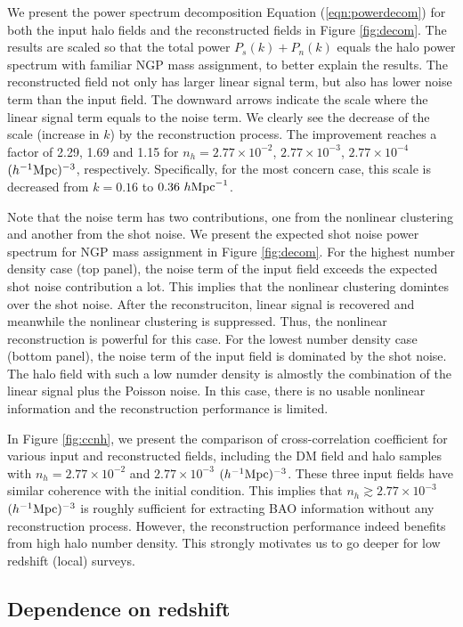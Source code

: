 \documentclass[iop]{emulateapj}
\newcommand{\mpch}{h^{-1} {\rm Mpc}}
\newcommand{\hmpc}{h {\rm Mpc}^{-1}}
\begin{document}
{We present the power spectrum decomposition Equation (\ref{eqn:powerdecom}) for both the input halo fields and the reconstructed fields in Figure \ref{fig:decom}.
The results are scaled so that the total power $P_s(k)+P_n(k)$ equals the halo power spectrum with familiar NGP mass assignment, to better explain the results.
The reconstructed field not only has larger linear signal term, but also has lower noise term than the input field.
The downward arrows indicate the scale where the linear signal term equals to the noise term.
We clearly see the decrease of the scale (increase in $k$) by the reconstruction process.
The improvement reaches a factor of 2.29, 1.69 and 1.15 for $n_h=2.77\times 10^{-2}$, $2.77\times 10^{-3}$, $2.77\times 10^{-4}$ $(\mpch)^{-3}$, respectively.
Specifically, for the most concern case, this scale is decreased from $k=0.16$ to $0.36\ \hmpc$.

Note that the noise term has two contributions, one from the nonlinear clustering and another from the shot noise.
We present the expected shot noise power spectrum for NGP mass assignment in Figure \ref{fig:decom}.
For the highest number density case (top panel), the noise term of the input field exceeds the expected shot noise contribution a lot.
This implies that the nonlinear clustering domintes over the shot noise.
After the reconstruciton, linear signal is recovered and meanwhile the nonlinear clustering is suppressed.
Thus, the nonlinear reconstruction is powerful for this case.
For the lowest number density case (bottom panel), the noise term of the input field is dominated by the shot noise.
The halo field with such a low numder density is almostly the combination of the linear signal plus the Poisson noise.
In this case, there is no usable nonlinear information and the reconstruction performance is limited.

In Figure \ref{fig:ccnh}, we present the comparison of cross-correlation coefficient for various input and reconstructed fields, including the DM field and halo samples with $n_h=2.77\times 10^{-2}$ and $2.77\times 10^{-3}$ $(\mpch)^{-3}$.
These three input fields have similar coherence with the initial condition.
This implies that $n_h\gtrsim 2.77\times 10^{-3}$ $(\mpch)^{-3}$ is roughly sufficient for extracting BAO information without any reconstruction process.
However, the reconstruction performance indeed benefits from high halo number density.
This strongly motivates us to go deeper for low redshift (local) surveys.

\subsection{Dependence on redshift}
\label{sec:evo}

}
\end{document}

